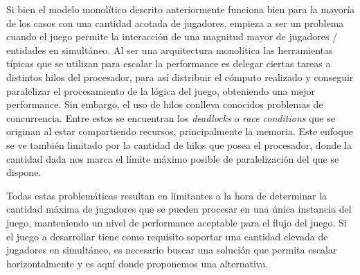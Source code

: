
\noindent Si bien el modelo monolítico descrito anteriormente funciona bien para la mayoría de los 
casos con una cantidad acotada de jugadores, empieza a ser un problema cuando el juego 
permite la interacción de una magnitud mayor de jugadores / entidades en simultáneo. 
Al ser una arquitectura monolítica las herramientas típicas que se utilizan para escalar 
la performance es delegar ciertas tareas a distintos hilos del procesador, para así distribuir 
el cómputo realizado y conseguir paralelizar el procesamiento de la lógica del juego, obteniendo una mejor performance. 
Sin embargo, el uso de hilos conlleva conocidos problemas de concurrencia. Entre estos se encuentran los \textit{deadlocks} o \textit{race conditions} que se originan al estar compartiendo 
recursos, principalmente la memoria. Este enfoque se ve también limitado por la cantidad de hilos 
que posea el procesador, donde la cantidad dada nos marca el límite máximo posible de paralelización
del que se dispone.

Todas estas problemáticas resultan en limitantes a la hora de determinar la cantidad máxima de jugadores
que se pueden procesar en una única instancia del juego, manteniendo un nivel de performance aceptable para el flujo del juego.
Si el juego a desarrollar tiene como requisito soportar una cantidad elevada de jugadores
en simultáneo, es necesario buscar una solución que permita escalar horizontalmente y es aquí donde proponemos
una alternativa.

